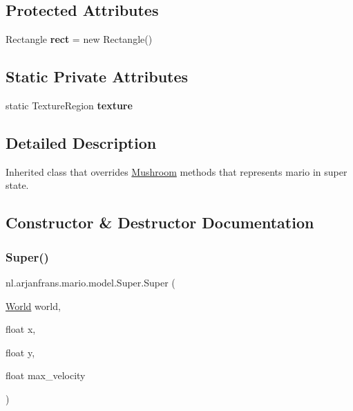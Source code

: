 \subsection*{Protected Attributes}
\begin{DoxyCompactItemize}
\item 
\mbox{\label{classnl_1_1arjanfrans_1_1mario_1_1model_1_1Super_a7be59d0c68b7edcb3d25bd1cd52d48a2}} 
Rectangle {\bfseries rect} = new Rectangle()
\end{DoxyCompactItemize}
\subsection*{Static Private Attributes}
\begin{DoxyCompactItemize}
\item 
\mbox{\label{classnl_1_1arjanfrans_1_1mario_1_1model_1_1Super_ad7b7fb471cfa5965bee27e54904d19f7}} 
static Texture\+Region {\bfseries texture}
\end{DoxyCompactItemize}


\subsection{Detailed Description}
Inherited class that overrides \hyperlink{classnl_1_1arjanfrans_1_1mario_1_1model_1_1Mushroom}{Mushroom} methods that represents mario in super state. 

\subsection{Constructor \& Destructor Documentation}
\mbox{\label{classnl_1_1arjanfrans_1_1mario_1_1model_1_1Super_ae31b2b33e224cd5db2e05aabc2e199d8}} 
\subsubsection{\texorpdfstring{Super()}{Super()}}
{\footnotesize\ttfamily nl.\+arjanfrans.\+mario.\+model.\+Super.\+Super (\begin{DoxyParamCaption}\item[{\hyperlink{classnl_1_1arjanfrans_1_1mario_1_1model_1_1World}{World}}]{world,  }\item[{float}]{x,  }\item[{float}]{y,  }\item[{float}]{max\+\_\+velocity }\end{DoxyParamCaption})}



